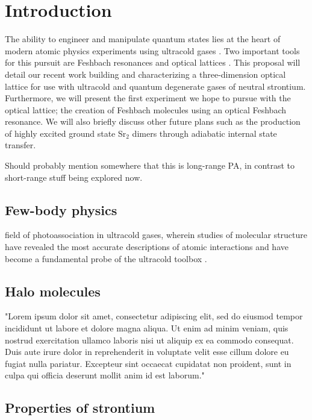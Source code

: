 \chapter{Introduction}
\label{ch:intro}

The ability to engineer and manipulate quantum states lies at the heart of modern atomic physics experiments using ultracold gases \cite{Davis1995,Anderson1995,Bradley1995,DeMarco1999,Lang2008,Ni2008}. Two important tools for this pursuit are Feshbach resonances \cite{Chin2010,Kohler2006} and optical lattices \cite{Bloch2008}. This proposal will detail our recent work building and characterizing a three-dimension optical lattice for use with ultracold and quantum degenerate gases of neutral strontium. Furthermore, we will present the first experiment we hope to pursue with the optical lattice; the creation of Feshbach molecules using an optical Feshbach resonance. We will also briefly discuss other future plans such as the production of highly excited ground state Sr$_2$ dimers through adiabatic internal state transfer.

Should probably mention somewhere that this is long-range PA, in contrast to short-range stuff being explored now.

\cite{Aman2018}

\section{Few-body physics}
\label{sec:few-body}

field of photoassociation in ultracold gases, wherein studies of molecular structure have revealed the most accurate descriptions of atomic interactions and have become a fundamental probe of the ultracold toolbox \cite{Jones2006}.

\section{Halo molecules}
\label{sec:halo}

"Lorem ipsum dolor sit amet, consectetur adipiscing elit, sed do eiusmod tempor incididunt ut labore et dolore magna aliqua. Ut enim ad minim veniam, quis nostrud exercitation ullamco laboris nisi ut aliquip ex ea commodo consequat. Duis aute irure dolor in reprehenderit in voluptate velit esse cillum dolore eu fugiat nulla pariatur. Excepteur sint occaecat cupidatat non proident, sunt in culpa qui officia deserunt mollit anim id est laborum."

\section{Properties of strontium}
\label{sec:sr}

